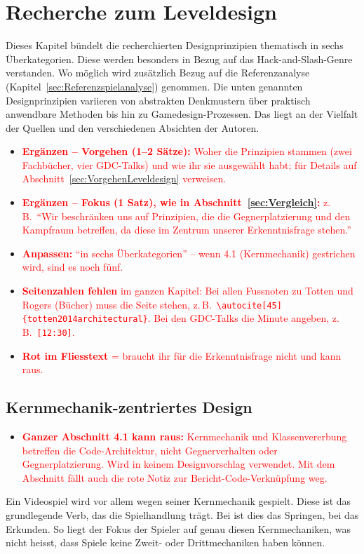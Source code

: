 \documentclass[../Main.tex]{subfiles}
\begin{document}
\section{Recherche zum Leveldesign} \label{sec:Leveldesign}
Dieses Kapitel bündelt die recherchierten Designprinzipien thematisch in sechs Überkategorien. Diese werden besonders in Bezug auf das Hack-and-Slash-Genre verstanden. Wo möglich wird zusätzlich Bezug auf die Referenzanalyse (Kapitel~\ref{sec:Referenzspielanalyse}) genommen. Die unten genannten Designprinzipien variieren von abstrakten Denkmustern über praktisch anwendbare Methoden bis hin zu Gamedesign-Prozessen. Das liegt an der Vielfalt der Quellen und den verschiedenen Absichten der Autoren.
\begin{itemize}[leftmargin=1.5cm]
    \item \textcolor{red}{\textbf{Ergänzen -- Vorgehen (1--2 Sätze):} Woher die Prinzipien stammen (zwei Fachbücher, vier GDC-Talks) und wie ihr sie ausgewählt habt; für Details auf Abschnitt~\ref{sec:VorgehenLeveldesign} verweisen.}
    \item \textcolor{red}{\textbf{Ergänzen -- Fokus (1 Satz), wie in Abschnitt~\ref{sec:Vergleich}:} z.\,B.\ \enquote{Wir beschränken uns auf Prinzipien, die die Gegnerplatzierung und den Kampfraum betreffen, da diese im Zentrum unserer Erkenntnisfrage stehen.}}
    \item \textcolor{red}{\textbf{Anpassen:} \enquote{in sechs Überkategorien} -- wenn 4.1 (Kernmechanik) gestrichen wird, sind es noch fünf.}
    \item \textcolor{red}{\textbf{Seitenzahlen fehlen} im ganzen Kapitel: Bei allen Fussnoten zu Totten und Rogers (Bücher) muss die Seite stehen, z.\,B.\ \texttt{\textbackslash autocite[45]\{totten2014architectural\}}. Bei den GDC-Talks die Minute angeben, z.\,B.\ \texttt{[12:30]}.}
    \item \textcolor{red}{\textbf{Rot im Fliesstext} = braucht ihr für die Erkenntnisfrage nicht und kann raus.}
\end{itemize}

\subsection{Kernmechanik-zentriertes Design} \label{sec:Kernmechanik}

\begin{itemize}[leftmargin=1.5cm]
    \item \textcolor{red}{\textbf{Ganzer Abschnitt 4.1 kann raus:} Kernmechanik und Klassenvererbung betreffen die Code-Architektur, nicht Gegnerverhalten oder Gegnerplatzierung. Wird in keinem Designvorschlag verwendet. Mit dem Abschnitt fällt auch die rote Notiz zur Bericht-Code-Verknüpfung weg.}
\end{itemize}
\begingroup\color{red}Ein Videospiel wird vor allem wegen seiner Kernmechanik gespielt. Diese ist das grundlegende Verb, das die Spielhandlung trägt.\autocite[110]{totten2014architectural} Bei  ist dies das Springen, bei  das Erkunden.\autocite{nintendo_supermariobros_1985,nintendo_zelda_1986} So liegt der Fokus der Spieler auf genau diesen Kernmechaniken, was nicht heisst, dass Spiele keine Zweit- oder Drittmechaniken haben können.
\end{document}
